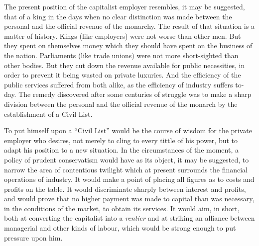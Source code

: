 \documentclass{book}
\begin{document}
The present position of the capitalist employer resembles, it may be suggested, that of a king in the days when no clear distinction was made between the personal and the official revenue of the monarchy. The result of that situation is a matter of history. Kings (like employers) were not worse than other men. But they spent on themselves money which they should have spent on the business of the nation. Parliaments (like trade unions) were not more short-sighted than other bodies. But they cut down the revenue available for public necessities, in order to prevent it being wasted on private luxuries. And the efficiency of the public services suffered from both alike, as the efficiency of industry suffers to-day. The remedy discovered after some centuries of struggle was to make a sharp division between the personal and the official revenue of the monarch by the establishment of a Civil List.

To put himself upon a “Civil List” would be the course of wisdom for the private employer who desires, not merely to cling to every tittle of his power, but to adapt his position to a new situation. In the circumstances of the moment, a policy of prudent conservatism would have as its object, it may be suggested, to narrow the area of contentious twilight which at present surrounds the financial operations of industry. It would make a point of placing all figures as to costs and profits on the table. It would discriminate sharply between interest and profits, and would prove that no higher payment was made to capital than was necessary, in the conditions of the market, to obtain its services. It would aim, in short, both at converting the capitalist into a \emph{rentier} and at striking an alliance between managerial and other kinds of labour, which would be strong enough to put pressure upon him.
\end{document}
